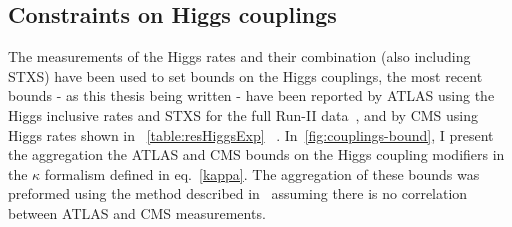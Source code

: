 \subsection{Constraints on Higgs couplings}
The measurements of the Higgs rates and their combination (also including STXS) have been used to set bounds on the Higgs couplings, the most recent bounds - as this thesis being written - have been reported by ATLAS using the Higgs inclusive rates and STXS for the full Run-II data~\cite{ATLAS2021vrm}, and  by CMS using Higgs rates shown in ~\autoref{table:resHiggsExp} ~\cite{CMS:2020gsy}. In~\autoref{fig:couplings-bound}, I present the aggregation the ATLAS and CMS bounds on the Higgs coupling modifiers in the $\kappa$ formalism defined in eq.~\eqref{kappa}. The aggregation of these bounds was preformed using the method described in~\cite{BHHR} assuming there is no correlation between ATLAS and CMS measurements.  
